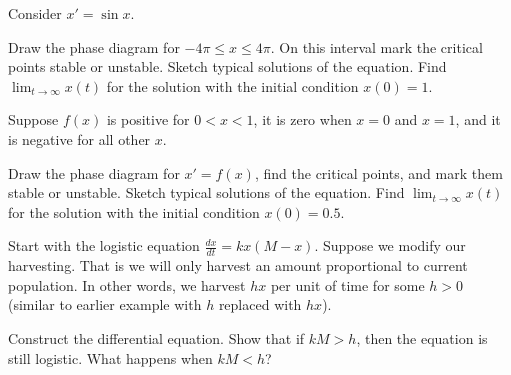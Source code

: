 \begin{exercise}
Consider $x' = \sin x$.
\begin{tasks}
\task Draw the phase diagram for $-4\pi \leq x \leq 4\pi$.  On this interval
mark the critical points stable or unstable.
\task Sketch typical solutions of the equation.
\task Find $\displaystyle \lim_{t\to \infty} x(t)$ for the solution with the initial condition
$x(0) = 1$.
\end{tasks}
\end{exercise}

\begin{exercise}
Suppose $f(x)$ is positive for $0 < x < 1$, it is zero when $x=0$ and $x=1$,
and it is negative for all other $x$.
\begin{tasks}
\task Draw the phase diagram for $x' = f(x)$,
find the critical points, and mark them stable or unstable.
\task Sketch typical solutions of the equation.
\task Find $\displaystyle \lim_{t\to \infty} x(t)$ for the solution with the initial condition
$x(0) = 0.5$.
\end{tasks}
\end{exercise}

\begin{exercise}
Start with the logistic equation
$\frac{dx}{dt} = kx(M-x)$.
Suppose we modify our harvesting.  That is we will only harvest 
an amount proportional to current population.  In other words, we harvest $hx$
per unit of time
for some $h > 0$ (similar to earlier example with $h$ replaced with $hx$).
\begin{tasks}
\task Construct the differential equation. 
\task Show that if $kM > h$, then
the equation is still logistic.
\task What happens when $kM < h$?
\end{tasks}
\end{exercise}

